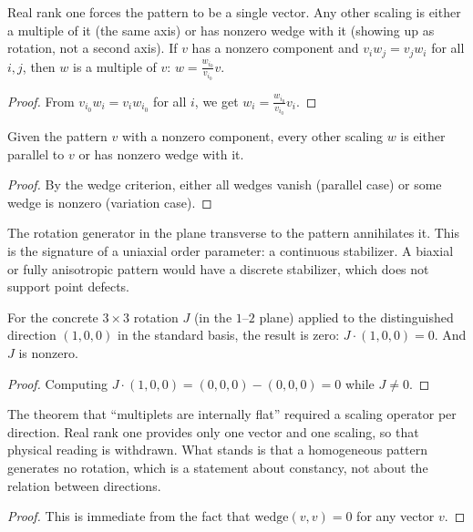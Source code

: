 \begin{theorem}
Real rank one forces the pattern to be a single vector. Any other scaling is either a multiple of it
(the same axis) or has nonzero wedge with it (showing up as rotation, not a second axis).
If $v$ has a nonzero component and $v_i w_j = v_j w_i$ for all $i, j$, then $w$ is a multiple of $v$:
$w = \frac{w_{i_0}}{v_{i_0}} v$.
\end{theorem}
\begin{proof}
From $v_{i_0} w_i = v_i w_{i_0}$ for all $i$, we get $w_i = \frac{w_{i_0}}{v_{i_0}} v_i$.
\end{proof}

\begin{theorem}
Given the pattern $v$ with a nonzero component, every other scaling $w$ is either parallel to $v$ or has
nonzero wedge with it.
\end{theorem}
\begin{proof}
By the wedge criterion, either all wedges vanish (parallel case) or some wedge is nonzero (variation case).
\end{proof}

\begin{theorem}
The rotation generator in the plane transverse to the pattern annihilates it. This is the signature of
a uniaxial order parameter: a continuous stabilizer. A biaxial or fully anisotropic pattern would have
a discrete stabilizer, which does not support point defects.

For the concrete $3 \times 3$ rotation $J$ (in the $1$--$2$ plane) applied to the distinguished direction
$(1, 0, 0)$ in the standard basis, the result is zero: $J \cdot (1, 0, 0) = 0$. And $J$ is nonzero.
\end{theorem}
\begin{proof}
Computing $J \cdot (1, 0, 0) = (0, 0, 0) - (0, 0, 0) = 0$ while $J \neq 0$.
\end{proof}

\begin{theorem}
The theorem that ``multiplets are internally flat'' required a scaling operator per direction.
Real rank one provides only one vector and one scaling, so that physical reading is withdrawn.
What stands is that a homogeneous pattern generates no rotation, which is a statement about constancy,
not about the relation between directions.
\end{theorem}
\begin{proof}
This is immediate from the fact that $\text{wedge}(v, v) = 0$ for any vector $v$.
\end{proof}


